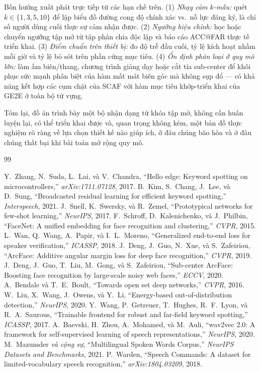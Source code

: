 \documentclass[12pt,a4paper]{report}
\begin{document}
Bốn hướng xuất phát trực tiếp từ các hạn chế trên.
(1) \emph{Nhạy cảm $k$-mẫu:} quét $k\in\{1,3,5,10\}$ để lập biểu đồ đường cong
độ chính xác vs.\ nỗ lực đăng ký, là chỉ số người dùng cuối thực sự cảm nhận được.
(2) \emph{Ngưỡng hiệu chỉnh:} học hoặc chuyển ngưỡng tập mở từ tập phân chia
độc lập và báo cáo ACC@FAR thực tế triển khai.
(3) \emph{Điểm chuẩn trên thiết bị:} đo độ trễ đầu cuối, tỷ lệ kích hoạt nhầm mỗi
giờ và tỷ lệ bỏ sót trên phần cứng mục tiêu.
(4) \emph{Ổn định phân loại ở quy mô lớn:} làm ấm biên/thang, chương trình giảng
dạy hoặc cắt tỉa sub-center để khôi phục sức mạnh phân biệt của hàm mất mát biên
góc mà không sụp đổ --- có khả năng kết hợp các cụm chặt của SCAF với hàm mục tiêu
khớp-triển khai của GE2E ở toàn bộ từ vựng.

Tóm lại, đồ án trình bày một bộ nhận dạng từ khóa tập mở, không cần huấn luyện
lại, có thể triển khai được và, quan trọng không kém, một bản đồ thực nghiệm rõ
ràng về lựa chọn thiết kế nào giúp ích, ở đâu chúng bão hòa và ở đâu chúng thất
bại khi bài toán mở rộng quy mô.

\begin{thebibliography}{99}
\footnotesize

 Y.~Zhang, N.~Suda, L.~Lai, và V.~Chandra,
``Hello edge: Keyword spotting on microcontrollers,'' \emph{arXiv:1711.07128}, 2017.
 B.~Kim, S.~Chang, J.~Lee, và D.~Sung,
``Broadcasted residual learning for efficient keyword spotting,'' \emph{Interspeech}, 2021.
 J.~Snell, K.~Swersky, và R.~Zemel,
``Prototypical networks for few-shot learning,'' \emph{NeurIPS}, 2017.
 F.~Schroff, D.~Kalenichenko, và J.~Philbin,
``FaceNet: A unified embedding for face recognition and clustering,'' \emph{CVPR}, 2015.
 L.~Wan, Q.~Wang, A.~Papir, và I.~L.~Moreno,
``Generalized end-to-end loss for speaker verification,'' \emph{ICASSP}, 2018.
 J.~Deng, J.~Guo, N.~Xue, và S.~Zafeiriou,
``ArcFace: Additive angular margin loss for deep face recognition,'' \emph{CVPR}, 2019.
 J.~Deng, J.~Guo, T.~Liu, M.~Gong, và S.~Zafeiriou,
``Sub-center ArcFace: Boosting face recognition by large-scale noisy web faces,'' \emph{ECCV}, 2020.
 A.~Bendale và T.~E.~Boult,
``Towards open set deep networks,'' \emph{CVPR}, 2016.
 W.~Liu, X.~Wang, J.~Owens, và Y.~Li,
``Energy-based out-of-distribution detection,'' \emph{NeurIPS}, 2020.
 Y.~Wang, P.~Getreuer, T.~Hughes, R.~F.~Lyon, và R.~A.~Saurous,
``Trainable frontend for robust and far-field keyword spotting,'' \emph{ICASSP}, 2017.
 A.~Baevski, H.~Zhou, A.~Mohamed, và M.~Auli,
``wav2vec 2.0: A framework for self-supervised learning of speech representations,'' \emph{NeurIPS}, 2020.
 M.~Mazumder \emph{và cộng sự},
``Multilingual Spoken Words Corpus,'' \emph{NeurIPS Datasets and Benchmarks}, 2021.
 P.~Warden,
``Speech Commands: A dataset for limited-vocabulary speech recognition,'' \emph{arXiv:1804.03209}, 2018.

\end{thebibliography}
\end{document}

